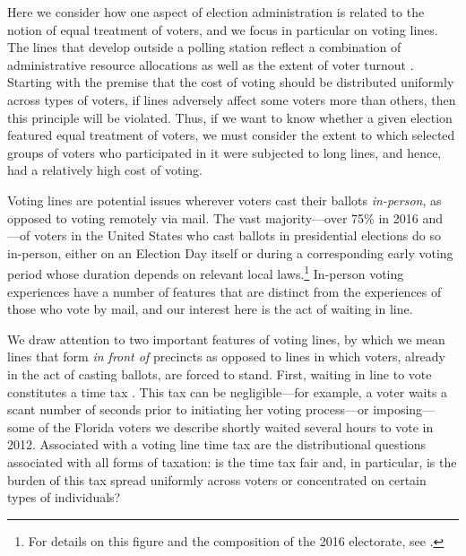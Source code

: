 \documentclass[12pt,titlepage]{article}
\begin{document}
Here we consider how one aspect of election administration is related
to the notion of equal treatment of voters, and we focus in particular
on voting lines.  The lines that develop outside a polling station
reflect a combination of administrative resource allocations as well
as the extent of voter turnout
\citep[e.g.,][]{herronsmith:hanoverstudy}.  Starting with the premise
that the cost of voting should be distributed uniformly across types
of voters, if lines adversely affect some voters more than others,
then this principle will be violated.  Thus, if we want to know
whether a given election featured equal treatment of voters, we must
consider the extent to which selected groups of voters who
participated in it were subjected to long lines, and hence, had a
relatively high cost of voting.

Voting lines are potential issues wherever voters cast their ballots
\emph{in-person}, as opposed to voting remotely via mail.  The vast
majority---over 75\% in 2016 and ---of voters in the United States who
cast ballots in presidential elections do so in-person, either on an
Election Day itself or during a corresponding early voting period
whose duration depends on relevant local laws.\footnote{For details on
  this figure and the composition of the 2016 electorate, see
  \citet{eac:2016}.} In-person voting experiences have a number of
features that are distinct from the experiences of those who vote by
mail, and our interest here is the act of waiting in line.





We draw attention to two important features of voting lines, by which
we mean lines that form \emph{in front of} precincts as opposed to
lines in which voters, already in the act of casting ballots, are
forced to stand.  First, waiting in line to vote constitutes a time
tax \citep{mukherjee:timetax}.  This tax can be negligible---for
example, a voter waits a scant number of seconds prior to initiating
her voting process---or imposing---some of the Florida voters we
describe shortly waited several hours to vote in 2012.  Associated
with a voting line time tax are the distributional questions
associated with all forms of taxation: is the time tax fair and, in
particular, is the burden of this tax spread uniformly across voters
or concentrated on certain types of individuals?
\end{document}
